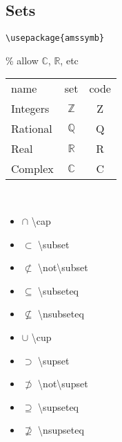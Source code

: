 \subsection*{Sets}
\begin{code}{}\begin{lstlisting}
\usepackage{amssymb} 
\end{lstlisting}
\end{code} \% allow $\mathbb{C}$, $\mathbb{R}$, etc \\
\begin{tabular}{l c c}
    name& set & code \\
    Integers & $\mathbb{Z}$ & Z \\
    Rational & $\mathbb{Q}$ & Q \\
    Real & $\mathbb{R}$ & R \\
    Complex & $\mathbb{C}$ & C \\
\end{tabular} \\


\begin{minipage}{3cm}
\begin{itemize}[label={}]
    \item $\cap$ \textbackslash cap
    \item $\subset$ \textbackslash subset
    \item $\not\subset$ \textbackslash not\textbackslash subset
    \item $\subseteq$ \textbackslash subseteq
    \item $\nsubseteq$ \textbackslash nsubseteq
\end{itemize} 
\end{minipage}
\begin{minipage}{3cm}
\begin{itemize}[label={}]
    \item $\cup$ \textbackslash cup
    \item $\supset$ \textbackslash supset
    \item $\not\supset$ \textbackslash not\textbackslash supset
    \item $\supseteq$ \textbackslash supseteq
    \item $\nsupseteq$ \textbackslash nsupseteq
\end{itemize} 
\end{minipage}


